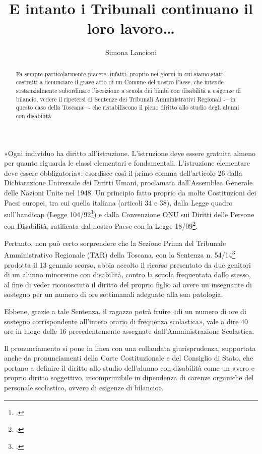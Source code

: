 \author{Simona Lancioni}
\title{E intanto i Tribunali continuano il loro lavoro…}
\label{cha:lancioni240114}
\begin{abstract}
Fa sempre particolarmente piacere, infatti, proprio nei giorni in cui siamo stati costretti a denunciare il grave atto di un Comune del nostro Paese, che intende sostanzialmente subordinare l'iscrizione a scuola dei bimbi con disabilità a esigenze di bilancio, vedere il ripetersi di Sentenze dei Tribunali Amministrativi Regionali -– in questo caso della Toscana –- che ristabiliscono il pieno diritto allo studio degli alunni con disabilità
\end{abstract}
\maketitle
{}
«Ogni individuo ha diritto all'istruzione. L'istruzione deve essere gratuita almeno per quanto riguarda le classi elementari e fondamentali. L'istruzione elementare deve essere obbligatoria»: esordisce così il primo comma dell'articolo 26 dalla Dichiarazione Universale dei Diritti Umani, proclamata dall'Assemblea Generale delle Nazioni Unite nel 1948. Un principio fatto proprio da molte Costituzioni dei Paesi europei, tra cui quella italiana (articoli 34 e 38), dalla Legge quadro sull'handicap (Legge 104/92\footcite{Legge_104_92}) e dalla Convenzione ONU sui Diritti delle Persone con Disabilità, ratificata dal nostro Paese con la Legge 18/09\footcite{Legge18_2009}.

Pertanto, non può certo sorprendere che la Sezione Prima del Tribunale Amministrativo Regionale (TAR) della Toscana, con la Sentenza n. 54/14\footcite{TARToscana2014} prodotta il 13 gennaio scorso, abbia accolto il ricorso presentato da due genitori di un alunno minorenne con disabilità, contro la scuola frequentata dallo stesso, al fine di veder riconosciuto il diritto del proprio figlio ad avere un insegnante di sostegno per un numero di ore settimanali adeguato alla sua patologia.

Ebbene, grazie a tale Sentenza, il ragazzo potrà fruire «di un numero di ore di sostegno corrispondente all'intero orario di frequenza scolastica», vale a dire 40 ore in luogo delle 16 precedentemente assegnate dall'Amministrazione Scolastica.

Il pronunciamento si pone in linea con una collaudata giurisprudenza, supportata anche da pronunciamenti della Corte Costituzionale e del Consiglio di Stato, che portano a definire il diritto allo studio dell'alunno con disabilità come un «vero e proprio diritto soggettivo, incomprimibile in dipendenza di carenze organiche del personale scolastico, ovvero di esigenze di bilancio».

